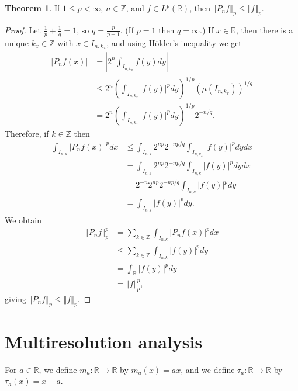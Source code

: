 \documentclass{article}
\newcommand{\norm}[1]{\left\Vert #1 \right\Vert}
\theoremstyle{definition}
\newtheorem{theorem}{Theorem}
\theoremstyle{definition}
\begin{document}
\begin{theorem}
If $1 \leq p < \infty$, $n \in \mathbb{Z}$, and $f \in L^p(\mathbb{R})$, then $\norm{P_nf}_p
\leq \norm{f}_p$.
\end{theorem}
\begin{proof}
Let $\frac{1}{p}+\frac{1}{q}=1$, so $q=\frac{p}{p-1}$.  (If $p=1$ then $q=\infty$.)
If $x \in \mathbb{R}$, then there is a unique  $k_x \in \mathbb{Z}$ with $x \in I_{n,k_x}$, and  using H\"older's inequality we get
\begin{align*}
|P_n f(x)|& = \left| 2^n \int_{I_{n,k_x}} f(y) dy \right| \\
&\leq 2^n \left(  \int_{I_{n,k_x}} |f(y)|^p dy \right)^{1/p} (\mu(I_{n,k_x}))^{1/q}\\
&=2^n \left(  \int_{I_{n,k_x}} |f(y)|^p dy \right)^{1/p} 2^{-n/q}.
\end{align*}
Therefore, if $k \in \mathbb{Z}$ then
\begin{align*}
\int_{I_{n,k}} |P_nf(x)|^p dx&\leq \int_{I_{n,k}}  2^{np} 2^{-np/q}  \int_{I_{n,k_x}} |f(y)|^p dydx\\
&= \int_{I_{n,k}}  2^{np} 2^{-np/q}  \int_{I_{n,k}} |f(y)|^p dydx\\
&=2^{-n}  2^{np} 2^{-np/q}\int_{I_{n,k}} |f(y)|^p dy\\
&=\int_{I_{n,k}} |f(y)|^p dy.
\end{align*}
We obtain
\begin{align*}
\norm{P_nf}_p^p&=\sum_{k \in \mathbb{Z}} \int_{I_{n,k}} |P_nf(x)|^p dx\\
&\leq\sum_{k \in \mathbb{Z}} \int_{I_{n,k}} |f(y)|^p dy\\
&=\int_{\mathbb{R}}  |f(y)|^p dy\\
&=\norm{f}_p^p,
\end{align*}
giving $\norm{P_nf}_p \leq \norm{f}_p$.
\end{proof}



\section{Multiresolution analysis}
For $a \in \mathbb{R}$, we define $m_a:\mathbb{R} \to \mathbb{R}$ by $m_a(x)=ax$,
and we define $\tau_a:\mathbb{R} \to \mathbb{R}$ by $\tau_a(x)=x-a$.
\end{document}
